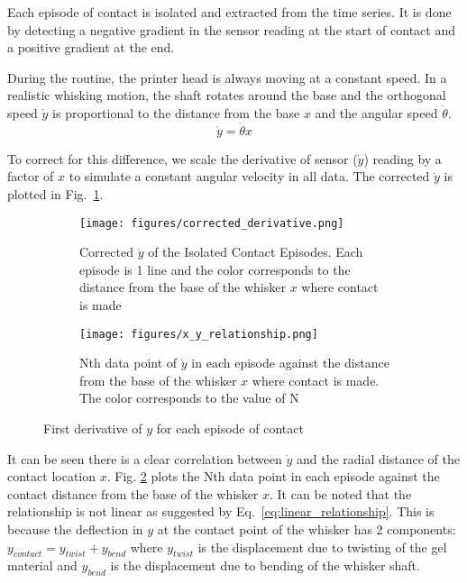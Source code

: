 \documentclass[runningheads]{llncs}
\begin{document}
Each episode of contact is isolated and extracted from the time series. It is done by detecting a negative gradient in the sensor reading at the start of contact and a positive gradient at the end. 

During the routine, the printer head is always moving at a constant speed. In a realistic whisking motion, the shaft rotates around the base and the orthogonal speed \(\dot{y}\) is proportional to the distance from the base \(x\) and the angular speed \(\dot{\theta}\).
\begin{equation}\label{eq:linear_relationship}
\dot{y} = \dot{\theta}x
\end{equation}

To correct for this difference, we scale the derivative of sensor (\(\dot{y}\)) reading by a factor of \(x\) to simulate a constant angular velocity in all data. The corrected \(\dot{y}\) is plotted in Fig.~\ref{fig:corrected_derivative.png}.

\begin{figure}
    \centering
    \begin{subfigure}[t]{.48\textwidth}
        \centering
        \texttt{[image: figures/corrected\_derivative.png]}
        \caption{Corrected \(\dot{y}\) of the Isolated Contact Episodes. Each episode is 1 line and the color corresponds to the distance from the base of the whisker \(x\) where contact is made}
        \label{fig:corrected_derivative.png}
    \end{subfigure}
    \hspace{3pt}
    \begin{subfigure}[t]{.48\textwidth}
        \centering
        \texttt{[image: figures/x\_y\_relationship.png]}
        \caption{Nth data point of \(\dot{y}\) in each episode against the distance from the base of the whisker \(x\) where contact is made. The color corresponds to the value of N}
        \label{fig:x_y_relationship.png}
    \end{subfigure}
    \vspace{-5pt}
    \caption{First derivative of \(y\) for each episode of contact}
    \label{fig:episode_analysis}
\end{figure}


It can be seen there is a clear correlation between \(\dot{y}\) and the radial distance of the contact location \(x\). Fig. \ref*{fig:x_y_relationship.png} plots the Nth data point in each episode against the contact distance from the base of the whisker \(x\). It can be noted that the relationship is not linear as suggested by Eq.~\ref*{eq:linear_relationship}. This is because the deflection in \(y\) at the contact point of the whisker has 2 components: \(y_{contact} = y_{twist} + y_{bend}\) where \(y_{twist}\) is the displacement due to twisting of the gel material and \(y_{bend}\) is the displacement due to bending of the whisker shaft.
\end{document}
